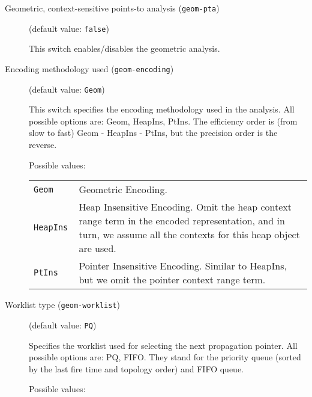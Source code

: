 \documentclass{article}
\begin{document}
\begin{description}

\item[Geometric, context-sensitive points-to analysis ({\tt geom-pta})]
(default value: {\tt false})




						    This switch enables/disables the geometric analysis.
						  


\item[Encoding methodology used ({\tt geom-encoding})]
(default value: {\tt Geom})




						    This switch specifies the encoding methodology used in the analysis. 
						    All possible options are: Geom, HeapIns, PtIns. The efficiency order
						    is (from slow to fast) Geom - HeapIns - PtIns, but the precision order is
						    the reverse.
						  



Possible values:\\
\begin{longtable}{p{1in}p{4in}}

{\tt Geom }
&

						      Geometric Encoding.
						    \\

{\tt HeapIns }
&

						      Heap Insensitive Encoding. Omit the heap context range term in the encoded representation, and in turn, we assume all the contexts for this heap object are used.
						    \\

{\tt PtIns }
&

						      Pointer Insensitive Encoding. Similar to HeapIns, but we omit the pointer context range term.
						    \\

\end{longtable}


\item[Worklist type ({\tt geom-worklist})]
(default value: {\tt PQ})




						    Specifies the worklist used for selecting the next propagation pointer. All possible options are: PQ, FIFO. They stand for the priority queue (sorted by the last fire time and topology order) and FIFO queue.
						  



Possible values:\\
\begin{longtable}{p{1in}p{4in}}


\end{longtable}
\end{description}
\end{document}
